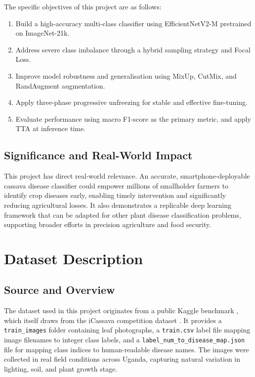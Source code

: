 \documentclass[12pt,a4paper]{article}
\begin{document}
The specific objectives of this project are as follows:
\begin{enumerate}[noitemsep, topsep=4pt]
    \item Build a high-accuracy multi-class classifier using EfficientNetV2-M pretrained on ImageNet-21k.
    \item Address severe class imbalance through a hybrid sampling strategy and Focal Loss.
    \item Improve model robustness and generalisation using MixUp, CutMix, and RandAugment augmentation.
    \item Apply three-phase progressive unfreezing for stable and effective fine-tuning.
    \item Evaluate performance using macro F1-score as the primary metric, and apply TTA at inference time.
\end{enumerate}

\subsection{Significance and Real-World Impact}

This project has direct real-world relevance. An accurate, smartphone-deployable cassava disease classifier could empower millions of smallholder farmers to identify crop diseases early, enabling timely intervention and significantly reducing agricultural losses. It also demonstrates a replicable deep learning framework that can be adapted for other plant disease classification problems, supporting broader efforts in precision agriculture and food security.

\section{Dataset Description}

\subsection{Source and Overview}

The dataset used in this project originates from a public Kaggle benchmark \cite{dataset}, which itself draws from the iCassava competition dataset \cite{cassava}. It provides a \texttt{train\_images} folder containing leaf photographs, a \texttt{train.csv} label file mapping image filenames to integer class labels, and a \texttt{label\_num\_to\_disease\_map.json} file for mapping class indices to human-readable disease names. The images were collected in real field conditions across Uganda, capturing natural variation in lighting, soil, and plant growth stage.
\end{document}

